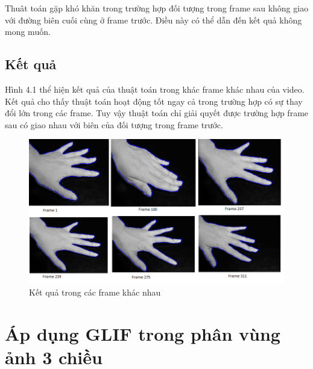 \documentclass[12pt,oneside,a4]{report}
\begin{document}
Thuât toán gặp khó khăn trong trường hợp đối tượng trong frame sau không giao với đường biên cuối cùng ở frame trước. Điều này có thể dẫn đến kết quả không mong muốn.
\section{Kết quả}
Hình 4.1 thể hiện kết quả của thuật toán trong khác frame khác nhau của video. Kết quả cho thấy thuật toán hoạt động tốt ngay cả trong trường hợp có sự thay đổi lớn trong các frame. Tuy vậy thuật toán chỉ giải quyết được trường hợp frame sau có giao nhau với biên của đối tượng trong frame trước. 
\begin{center}
\begin{figure}
\caption{Kết quả trong các frame khác nhau}
\includegraphics[scale=0.6]{figure/video.png}
\end{figure}

\end{center}   
\chapter{Áp dụng GLIF trong phân vùng ảnh 3 chiều}
\end{document}
